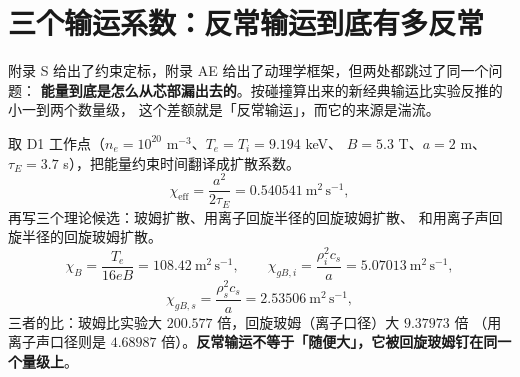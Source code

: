 
\section{三个输运系数：反常输运到底有多反常}
\label{sec:app-af-scales}

附录 S 给出了约束定标，附录 AE 给出了动理学框架，但两处都跳过了同一个问题：
\textbf{能量到底是怎么从芯部漏出去的}。按碰撞算出来的新经典输运比实验反推的小一到两个数量级，
这个差额就是「反常输运」，而它的来源是湍流。

取 D1 工作点（$n_e=10^{20}$ m$^{-3}$、$T_e=T_i=9.194$ keV、
$B=5.3$ T、$a=2$ m、$\tau_E=3.7$ s），把能量约束时间翻译成扩散系数。
\begin{equation}
\chi_{\mathrm{eff}}=\frac{a^2}{2\tau_E}
=0.540541\ \mathrm{m^2\,s^{-1}},
\label{eq:app-af-chieff}
\end{equation}
再写三个理论候选：玻姆扩散、用离子回旋半径的回旋玻姆扩散、
和用离子声回旋半径的回旋玻姆扩散。
\begin{equation}
\chi_B=\frac{T_e}{16eB}=108.42\ \mathrm{m^2\,s^{-1}},
\qquad
\chi_{gB,i}=\frac{\rho_i^2c_s}{a}=5.07013\ \mathrm{m^2\,s^{-1}},
\label{eq:app-af-chib}
\end{equation}
\begin{equation}
\chi_{gB,s}=\frac{\rho_s^2c_s}{a}=2.53506\ \mathrm{m^2\,s^{-1}},
\label{eq:app-af-chigb}
\end{equation}
三者的比：玻姆比实验大 $200.577$ 倍，回旋玻姆（离子口径）大 $9.37973$ 倍
（用离子声口径则是 $4.68987$ 倍）。\textbf{反常输运不等于「随便大」，它被回旋玻姆钉在同一个量级上}。

